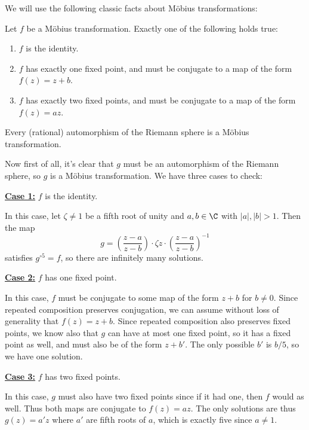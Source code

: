 \documentclass[11pt,letterpaper]{article}
\begin{document}
\begin{solution}
    \quad We will use the following classic facts about M\"obius transformations:
    \begin{claim}
        Let $f$ be a M\"obius transformation. Exactly one of the following holds true:
        \begin{enumerate}
            \item $f$ is the identity.
            \item $f$ has exactly one fixed point, and must be conjugate to a map of the form $f(z)=z+b$.
            \item $f$ has exactly two fixed points, and must be conjugate to a map of the form $f(z)=az$.
        \end{enumerate}
    \end{claim}

    \begin{claim}
        Every (rational) automorphism of the Riemann sphere is a M\"obius transformation.
    \end{claim}

    \quad Now first of all, it's clear that $g$ must be an automorphism of the Riemann sphere, so $g$ is a M\"obius transformation. We have three cases to check:

    \textbf{\underline{Case 1:}} $f$ is the identity.

    \quad In this case, let $\zeta\neq 1$ be a fifth root of unity and $a,b\in \C$ with $|a|, |b| > 1$. Then the map
    \[
        g = \left(\frac{z-a}{z-b}\right)\cdot \zeta z\cdot \left(\frac{z-a}{z-b}\right)^{-1}
    \]
    satisfies $g^{\circ 5} = f$, so there are infinitely many solutions.

    \textbf{\underline{Case 2:}} $f$ has one fixed point.

    \quad In this case, $f$ must be conjugate to some map of the form $z+b$ for $b\neq 0$. Since repeated composition preserves conjugation, we can assume without loss of generality that $f(z)=z+b$. Since repeated composition also preserves fixed points, we know also that $g$ can have at most one fixed point, so it has a fixed point as well, and must also be of the form $z+b'$. The only possible $b'$ is $b /5$, so we have one solution.

    \textbf{\underline{Case 3:}} $f$ has two fixed points.

    \quad In this case, $g$ must also have two fixed points since if it had one, then $f$ would as well. Thus both maps are conjugate to $f(z)=az$. The only solutions are thus $g(z)=a'z$ where $a'$ are fifth roots of $a$, which is exactly five since $a\neq 1$.
\end{solution}
\end{document}
